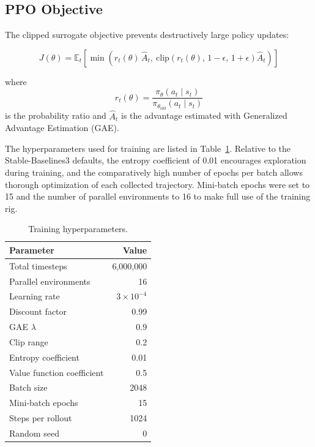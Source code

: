 \documentclass[10pt, conference, letterpaper]{IEEEtran}
\begin{document}
\subsection{PPO Objective}

The clipped surrogate objective prevents destructively large policy updates:

\begin{equation}
J(\theta) = \mathbb{E}_t \left[ \min \left( r_t(\theta) \, \hat{A}_t,\ \mathrm{clip}\left(r_t(\theta),\, 1 - \epsilon,\, 1 + \epsilon\right) \hat{A}_t \right) \right]
\end{equation}

where
\begin{equation}
r_t(\theta) = \frac{\pi_\theta(a_t \mid s_t)}{\pi_{\theta_{\text{old}}}(a_t \mid s_t)}
\end{equation}
is the probability ratio and $\hat{A}_t$ is the advantage estimated with Generalized Advantage Estimation (GAE).

The hyperparameters used for training are listed in Table~\ref{tab:hyper}. Relative to the Stable-Baselines3 defaults, the entropy coefficient of 0.01 encourages exploration during training, and the comparatively high number of epochs per batch allows thorough optimization of each collected trajectory. Mini-batch epochs were set to 15 and the number of parallel environments to 16 to make full use of the training rig.

\begin{table}[t]
\centering
\caption{Training hyperparameters.}
\label{tab:hyper}
\begin{tabular}{lr}
\toprule
Parameter & Value \\
\midrule
Total timesteps             & 6,000,000 \\
Parallel environments       & 16 \\
Learning rate               & $3 \times 10^{-4}$ \\
Discount factor             & 0.99 \\
GAE $\lambda$               & 0.9 \\
Clip range                  & 0.2 \\
Entropy coefficient         & 0.01 \\
Value function coefficient  & 0.5 \\
Batch size                  & 2048 \\
Mini-batch epochs           & 15 \\
Steps per rollout           & 1024 \\
Random seed                 & 0 \\
\bottomrule
\end{tabular}
\end{table}
\end{document}
